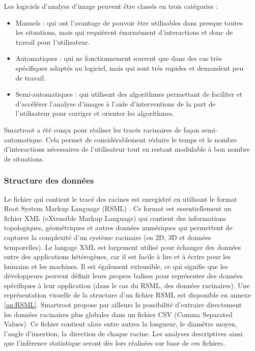 \noindent Les logiciels d'analyse d'image peuvent être classés en trois catégories :
\begin{itemize}
    \item Manuels : qui ont l'avantage de pouvoir être utilisables dans presque toutes les situations, mais qui requièrent énormément d'interactions et donc de travail pour l'utilisateur.
    \item Automatiques : qui ne fonctionnement souvent que dans des cas très spécifiques adaptés au logiciel, mais qui sont très rapides et demandent peu de travail.
    \item Semi-automatiques : qui utilisent des algorithmes permettant de faciliter et d'accélérer l'analyse d'images à l'aide d'interventions de la part de l'utilisateur pour corriger et orienter les algorithmes.
\end{itemize}
Smartroot a été conçu pour réaliser les tracés racinaires de façon semi-automatique.
Cela permet de considérablement réduire le temps et le nombre d'interactions nécessaires de l'utilisateur tout en restant modulable à bon nombre de situations.

\subsubsection{Structure des données}

Le fichier qui contient le tracé des racines est enregistré en utilisant le format Root System Markup Language (RSML) \citep{lobet_plant_2014}.
Ce format est essentiellement un fichier XML (eXtensible Markup Language) qui contient des informations topologiques, géométriques et autres données numériques qui permettent de capturer la complexité d'un système racinaire (en 2D, 3D et données temporelles).
Le langage XML est largement utilisé pour échanger des données entre des applications hétérogènes, car il est facile à lire et à écrire pour les humains et les machines. 
Il est également extensible, ce qui signifie que les développeurs peuvent définir leurs propres balises pour représenter des données spécifiques à leur application (dans le cas du RSML, des données racinaires).
Une représentation visuelle de la structure d'un fichier RSML est disponible en annexe \ref{an:RSML}.
Smartroot propose par ailleurs la possibilité d'extraire directement les données racinaires plus globales dans un fichier CSV (Comma Separated Values).
Ce fichier contient alors entre autres la longueur, le diamètre moyen, l'angle d'insertion, la direction de chaque racine.
Les analyses descriptives ainsi que l'inférence statistique seront dès lors réalisées sur base de ces fichiers.
\newline

